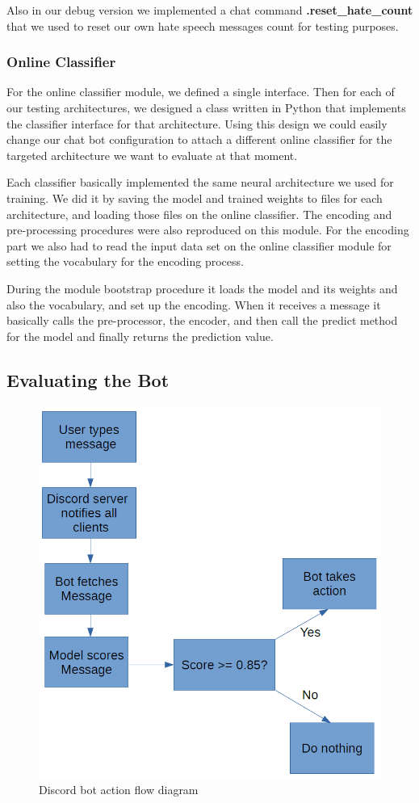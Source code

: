 \documentclass[conference]{sig-alternate-05-2015}
\begin{document}
    Also in our debug version we implemented a chat command \textbf{.reset\_hate\_count} that we used to reset our own hate speech messages count for testing purposes. 
 
\subsubsection{Online Classifier}
    For the online classifier module, we defined a single interface. Then for each of our testing architectures, we designed a class written in Python that implements the classifier interface for that architecture. Using this design we could easily change our chat bot configuration to attach a different online classifier for the targeted architecture we want to evaluate at that moment. 
    
    Each classifier basically implemented the same neural architecture we used for training. We did it by saving the model and trained weights to files for each architecture, and loading those files on the online classifier. The encoding and pre-processing procedures were also reproduced on this module. For the encoding part we also had to read the input data set on the online classifier module for setting the vocabulary for the encoding process. 
 
    During the module bootstrap procedure it loads the model and its weights and also the vocabulary, and set up the encoding. When it receives a message it basically calls the pre-processor, the encoder, and then call the predict method for the model and finally returns the prediction value. 
    
\subsection{Evaluating the Bot}

\begin{figure}
	\centering
	\includegraphics[width=0.8\linewidth]{"bot_in_action"}
	\caption{Discord bot action flow diagram}
	\label{fig:bot_in_action}
\end{figure}
\end{document}
